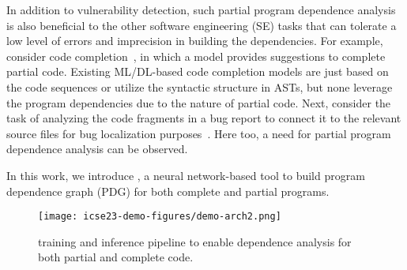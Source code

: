 In addition to vulnerability detection, such partial program dependence analysis is also beneficial to the other software engineering (SE) tasks that can tolerate a low level of errors and imprecision in building the dependencies. For example, consider code completion~\cite{codefill-icse22,facebook-icse21}, in which a model provides suggestions to complete partial code. Existing ML/DL-based code completion models are just based on the code sequences or utilize the syntactic structure in ASTs, but none leverage the program dependencies due to the nature of partial code. Next, consider the task of analyzing the code fragments in a bug report to connect it to the relevant source files for bug localization purposes~\cite{euler-fse19,icpc17}. Here too, a need for partial program dependence analysis can be observed.

In this work, we introduce \tool, a neural network-based tool to build
program dependence graph (PDG) for both complete and partial
programs. 

\begin{figure*}[hbt!]
\begin{center}
    \texttt{[image: icse23-demo-figures/demo-arch2.png]}
    \caption{\tool training and inference pipeline to enable dependence analysis for both partial and complete code.}
    \label{fig:model}
    \vspace{-10pt}
\end{center}
\end{figure*}

